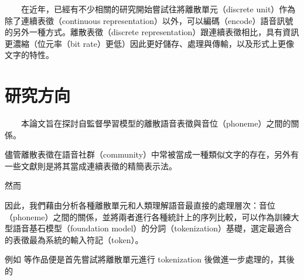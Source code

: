 
　　在近年，已經有不少相關的研究開始嘗試往將離散單元（discrete unit）作為除了連續表徵（continuous representation）以外，可以編碼（encode）語音訊號的另外一種方式。離散表徵（discrete representation）跟連續表徵相比，具有資訊更濃縮（位元率（bit rate）更低）因此更好儲存、處理與傳輸，以及形式上更像文字的特性。
    
\section{研究方向}  %

　　本論文旨在探討自監督學習模型的離散語音表徵與音位（phoneme）之間的關係。



    儘管離散表徵在語音社群（community）中常被當成一種類似文字的存在，另外有一些文獻則是將其當成連續表徵的精簡表示法。

    然而

    因此，我們藉由分析各種離散單元和人類理解語音最直接的處理層次：音位（phoneme）之間的關係，並將兩者進行各種統計上的序列比較，可以作為訓練大型語音基石模型（foundation model）的分詞（tokenization）基礎，選定最適合的表徵最為系統的輸入符記（token）。

    例如 \cite{wu2023wav2seq} 等作品便是首先嘗試將離散單元進行 tokenization 後做進一步處理的，其後的



